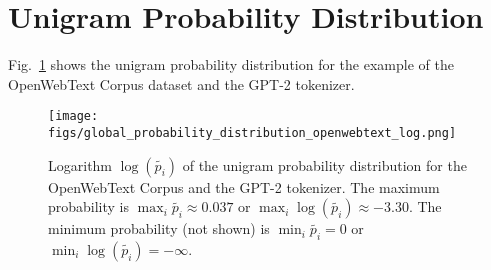 \section{Unigram Probability Distribution}
\label{app:unigram_probability_example}

Fig.~\ref{fig:prior_example_gpt2_openwebtext} shows the unigram probability distribution for the example of the OpenWebText Corpus dataset and the GPT-2 tokenizer.
\begin{figure}[H]
    \centering
    \texttt{[image: figs/global\_probability\_distribution\_openwebtext\_log.png]}
    \caption{Logarithm $\log(\widetilde{p_i})$ of the unigram probability distribution for the OpenWebText Corpus and the GPT-2 tokenizer. The maximum probability is $\max_{i} \widetilde{p_i} \approx 0.037$ or $\max_{i} \log(\widetilde{p_i}) \approx -3.30$. The minimum probability (not shown) is $\min_{i} \widetilde{p_i} = 0$ or $\min_{i} \log(\widetilde{p_i}) = -\infty$.}
    \label{fig:prior_example_gpt2_openwebtext}
\end{figure}
